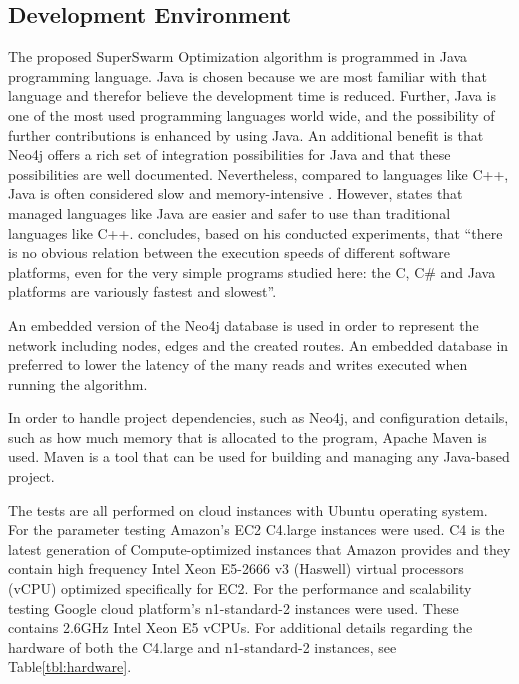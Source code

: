 \subsection{Development Environment}

The proposed SuperSwarm Optimization algorithm is programmed in Java programming language. Java is chosen because we are most familiar with that language and therefor believe the development time is reduced. Further, Java is one of the most used programming languages world wide, and the possibility of further contributions is enhanced by using Java. An additional benefit is that Neo4j offers a rich set of integration possibilities for Java and that these possibilities are well documented. Nevertheless, compared to languages like C++, Java is often considered slow and memory-intensive \citep{alnaser12}. However, \citet{sestoft10} states that managed languages like Java are easier and safer to use than traditional languages like C++. \citet{sestoft10} concludes, based on his conducted experiments, that ``there is no obvious relation between the execution speeds of different software platforms, even for the very simple programs studied here: the C, C\# and Java platforms are variously fastest and slowest''.

An embedded version of the Neo4j database is used in order to represent the network including nodes, edges and the created routes. An embedded database in preferred to lower the latency of the many reads and writes executed when running the algorithm.

In order to handle project dependencies, such as Neo4j, and configuration details, such as how much memory that is allocated to the program, Apache Maven\citep{website:maven} is used. Maven is a tool that can be used for building and managing any Java-based project. 

The tests are all performed on cloud instances with Ubuntu operating system. For the parameter testing Amazon's EC2 C4.large instances were used. C4 is the latest generation of Compute-optimized instances that Amazon provides and they contain high frequency Intel Xeon E5-2666 v3 (Haswell) virtual processors (vCPU) optimized specifically for EC2\citep{website:amazon}. For the performance and scalability testing Google cloud platform's n1-standard-2 instances were used. These contains 2.6GHz Intel Xeon E5 vCPUs\citep{website:google}. For additional details regarding the hardware of both the C4.large and n1-standard-2 instances, see Table\vref{tbl:hardware}. 

